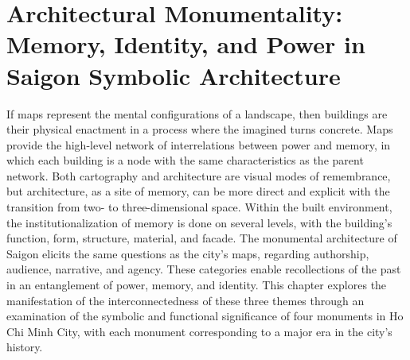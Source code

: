 \chapter[Architectural Monumentality]{Architectural Monumentality: Memory, Identity, and Power in Saigon Symbolic Architecture}\label{symbol}
If maps represent the mental configurations of a landscape, then buildings are their physical enactment in a process where the imagined turns concrete. Maps provide the high-level network of interrelations between power and memory, in which each building is a node with the same characteristics as the parent network. Both cartography and architecture are visual modes of remembrance, but architecture, as a site of memory, can be more direct and explicit with the transition from two- to three-dimensional space. Within the built environment, the institutionalization of memory is done on several levels, with the building’s function, form, structure, material, and facade. The monumental architecture of Saigon elicits the same questions as the city’s maps, regarding authorship, audience, narrative, and agency. These categories enable recollections of the past in an entanglement of power, memory, and identity. This chapter explores the manifestation of the interconnectedness of these three themes through an examination of the symbolic and functional significance of four monuments in Ho Chi Minh City, with each monument corresponding to a major era in the city’s history.
\vi

